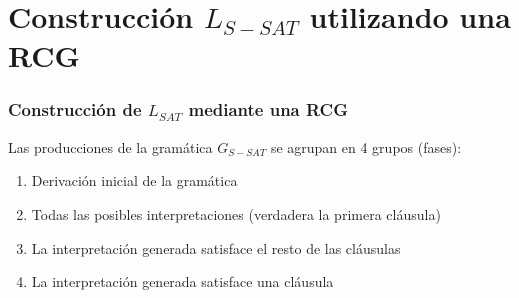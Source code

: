 \documentclass{beamer}
\begin{document}
\section{Construcción $L_{S-SAT}$ utilizando una RCG}




\begin{frame}
    \frametitle{Construcción de $L_{SAT}$ mediante una RCG}
    
    Las producciones de la gramática $G_{S-SAT}$ se agrupan en 4 grupos (fases):
    
    \begin{enumerate}
        \item Derivación inicial de la gramática
              \pause
        \item Todas las posibles interpretaciones (verdadera la primera cláusula)
              \pause
        \item La interpretación generada satisface el resto de las cláusulas
              \pause
        \item La interpretación generada satisface una cláusula
    \end{enumerate}
    
\end{frame}
\end{document}
